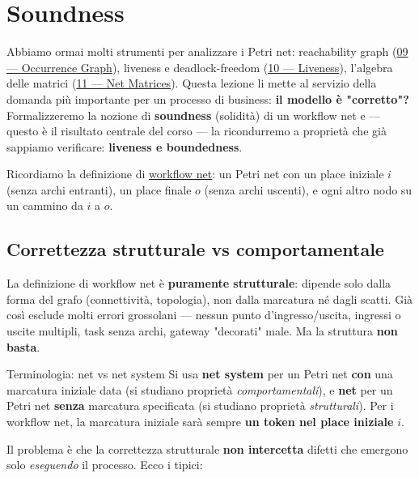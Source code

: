 \chapter{\texorpdfstring{Soundness}{Soundness}}
\label{ch:12}

Abbiamo ormai molti strumenti per analizzare i Petri net: reachability graph (\hyperref[ch:09]{09 — Occurrence Graph}), liveness e deadlock-freedom (\hyperref[ch:10]{10 — Liveness}), l'algebra delle matrici (\hyperref[ch:11]{11 — Net Matrices}). Questa lezione li mette al servizio della domanda più importante per un processo di business: \textbf{il modello è "corretto"?} Formalizzeremo la nozione di \textbf{soundness} (solidità) di un workflow net e — questo è il risultato centrale del corso — la ricondurremo a proprietà che già sappiamo verificare: \textbf{liveness e boundedness}.

Ricordiamo la definizione di \hyperref[ch:04]{workflow net}: un Petri net con un place iniziale $i$ (senza archi entranti), un place finale $o$ (senza archi uscenti), e ogni altro nodo su un cammino da $i$ a $o$.

\section{\texorpdfstring{Correttezza strutturale vs comportamentale}{Correttezza strutturale vs comportamentale}}

La definizione di workflow net è \textbf{puramente strutturale}: dipende solo dalla forma del grafo (connettività, topologia), non dalla marcatura né dagli scatti. Già così esclude molti errori grossolani — nessun punto d'ingresso/uscita, ingressi o uscite multipli, task senza archi, gateway "decorati" male. Ma la struttura \textbf{non basta}.

\begin{boxnote}{Terminologia: net vs net system}
Si usa \textbf{net system} per un Petri net \textbf{con} una marcatura iniziale data (si studiano proprietà \emph{comportamentali}), e \textbf{net} per un Petri net \textbf{senza} marcatura specificata (si studiano proprietà \emph{strutturali}). Per i workflow net, la marcatura iniziale sarà sempre \textbf{un token nel place iniziale} $i$.
\end{boxnote}

Il problema è che la correttezza strutturale \textbf{non intercetta} difetti che emergono solo \emph{eseguendo} il processo. Ecco i tipici:

